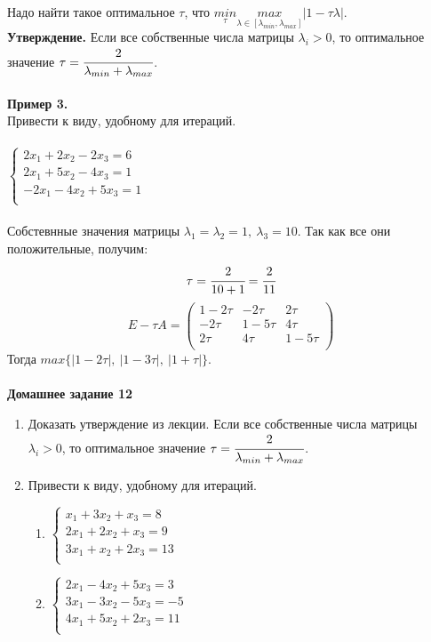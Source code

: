 \documentclass[12pt]{article}
\theoremstyle{definition}
\numberwithin{equation}{section}
\begin{document}
	Надо найти такое оптимальное $\tau$, что $\underset{\tau}{min}\underset{\lambda \in [\lambda_{min},\lambda_{max}]}{max}|1-\tau \lambda|$.\\
	\textbf{Утверждение.} Если все собственные числа матрицы $\lambda_i>0$, то оптимальное значение $\tau=\cfrac{2}{\lambda_{min}+\lambda_{max}}$.\\ \\
	\newpage
	\noindent\textbf{Пример 3.}\\
	Привести к виду, удобному для итераций.\\ \\
	$
	\left\{
	\begin{array}{lcl}
	2x_1+2x_2-2x_3=6\\
	2x_1+5x_2-4x_3=1\\
	-2x_1-4x_2+5x_3=1\\
	\end{array}
	\right.
	$
	\\ \\
	Собстевнные значения матрицы $\lambda_1=\lambda_2=1,~\lambda_3=10$. Так как все они положительные, получим: 
	$$\tau=\cfrac{2}{10+1}=\cfrac{2}{11}$$
	\[E-\tau A=\begin{pmatrix}
	1-2\tau & -2\tau & 2\tau \\
	-2\tau & 1-5\tau & 4\tau \\
	2\tau & 4\tau & 1-5\tau \\
	\end{pmatrix}\]
	Тогда $max\{|1-2\tau|,~|1-3\tau|,~|1+\tau|\}$.\\
	~\\
	\textbf{Домашнее задание 12}\begin{enumerate}
		\item Доказать утверждение из лекции. Если все собственные числа матрицы $\lambda_i>0$, то оптимальное значение $\tau=\cfrac{2}{\lambda_{min}+\lambda_{max}}$.
		\item Привести к виду, удобному для итераций.
		\begin{enumerate}
			\item $
			\left\{
			\begin{array}{lcl}
			x_1+3x_2+x_3=8\\
			2x_1+2x_2+x_3=9\\
			3x_1+x_2+2x_3=13\\
			\end{array}
			\right.
			$
			\item $
			\left\{
			\begin{array}{lcl}
			2x_1-4x_2+5x_3=3\\
			3x_1-3x_2-5x_3=-5\\
			4x_1+5x_2+2x_3=11\\
			\end{array}
			\right.
			$
		\end{enumerate}
	\end{enumerate}
	~\\
\end{document}
